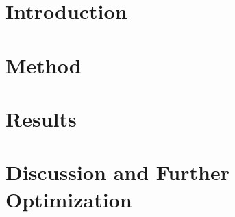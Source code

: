\documentclass[3p]{elsarticle/elsarticle}
\begin{document}
\begin{frontmatter}
\begin{abstract}

\end{abstract}
\begin{keyword}

\end{keyword}

\end{frontmatter}
\tableofcontents
\section{Introduction}

\section{Method}
	
	
\section{Results}
	
\section{Discussion and Further Optimization}
	
\renewcommand\refname{References}

\end{document}

